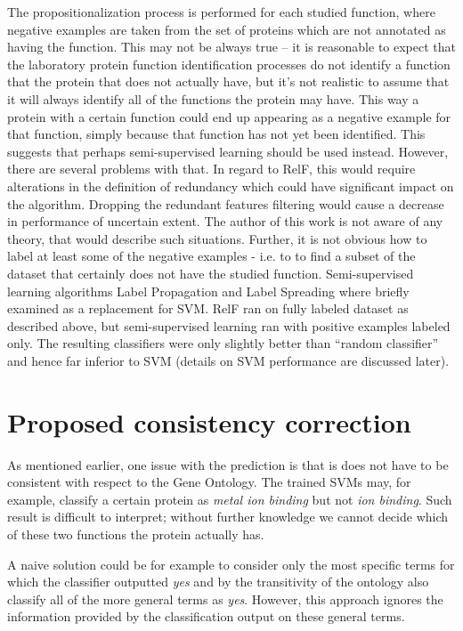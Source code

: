 \documentclass[11pt,twoside,a4paper]{book}
\begin{document}
The propositionalization process is performed for each studied function,
where negative examples are taken from the set of proteins which are not annotated
as having the function.
This may not be always true -- it is reasonable to expect that the laboratory protein
function identification processes do not identify a function that the protein that does not
actually have, but it's not realistic to assume that it will always identify all of the functions
the protein may have. 
This way a protein with a certain function could end up appearing as a negative example 
for that function, simply because that function has not yet been identified.
This suggests that perhaps semi-supervised learning should be used instead.
However, there are several problems with that.
In regard to RelF, this would require alterations in the definition of redundancy which 
could have significant impact on the algorithm.
Dropping the redundant features filtering would cause a decrease in performance
of uncertain extent. 
The author of this work is not aware of any theory, that would describe such situations.
Further, it is not obvious how to label at least some of the negative examples -
i.e. to to find a subset of the dataset that certainly does not have the studied function.
Semi-supervised learning algorithms Label Propagation and Label Spreading \cite{semi}
where briefly examined as a replacement for SVM.
RelF ran on fully labeled dataset as described above, but semi-supervised learning
ran with positive examples labeled only.
The resulting classifiers were only slightly better than ``random classifier''
and hence far inferior to SVM (details on SVM performance are discussed later).

\section{Proposed consistency correction}
As mentioned earlier, one issue with the prediction is that is does not have to be
consistent with respect to the Gene Ontology.
The trained SVMs may, for example, classify a certain protein
as \emph{metal ion binding}
but not \emph{ion binding}.
Such result is difficult to interpret;
without further knowledge we cannot decide
which of these two functions the protein actually has.

A naive solution could be for example
to consider only the most specific terms
for which the classifier outputted \emph{yes}
and by the transitivity of the ontology also
classify all of the more general terms as \emph{yes}.
However, this approach ignores the information
provided by the classification output on these
general terms. 
\end{document}
